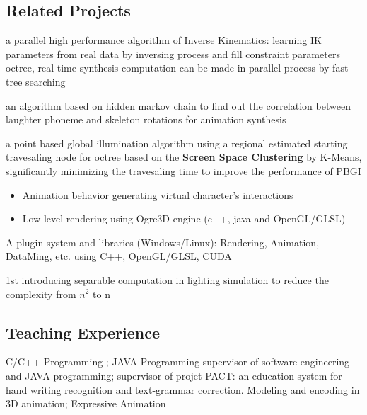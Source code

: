 \subsection{Related Projects}
{
a parallel high performance algorithm of Inverse Kinematics: learning IK parameters from real data by inversing process and fill constraint parameters octree, real-time synthesis computation can be made in parallel process by fast tree searching}

{
an algorithm based on hidden markov chain to find out the correlation between laughter phoneme and skeleton rotations for animation synthesis 
}

{
a point based global illumination algorithm using a regional estimated starting travesaling node for octree based on the \textbf{Screen Space Clustering} by K-Means, significantly minimizing the travesaling time to improve the performance of PBGI
}

{
\begin{itemize}
\item Animation behavior generating virtual character's interactions
\item Low level rendering using Ogre3D engine (c++, java and OpenGL/GLSL)
\end{itemize}
}

{
A plugin system and libraries (Windows/Linux): Rendering, Animation, DataMing, etc.
using C++, OpenGL/GLSL, CUDA
}

{
1st introducing separable computation in lighting simulation to reduce the complexity from $n^2$ to n
}

\subsection{Teaching Experience}
{
C/C++ Programming ; JAVA Programming
}
{
supervisor of software engineering and JAVA programming; supervisor of projet PACT: an education system for hand writing recognition and text-grammar correction.
}
{
Modeling and encoding in 3D animation; Expressive Animation
}

